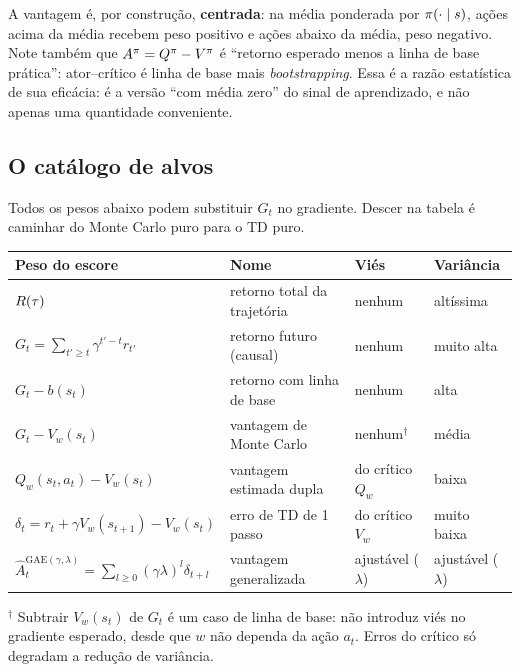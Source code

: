 \documentclass[11pt, a4paper]{article}
\newcommand{\Adv}{A}
\newcommand{\Ahat}{\hat{A}}
\begin{document}
\begin{ideiabox}
A vantagem é, por construção, \textbf{centrada}: na média ponderada por
$\pi(\cdot\mid s)$, ações acima da média recebem peso positivo e ações abaixo
da média, peso negativo. Note também que $\Adv^{\pol} = \Qpi - \Vpi$ é
``retorno esperado menos a linha de base prática'': ator--crítico é linha de base
mais \emph{bootstrapping}. Essa é a
razão estatística de sua eficácia: é a versão ``com média zero'' do sinal de
aprendizado, e não apenas uma quantidade conveniente.
\end{ideiabox}

\subsection{O catálogo de alvos}

Todos os pesos abaixo podem substituir $G_t$ no gradiente. Descer na tabela é
caminhar do Monte Carlo puro para o TD puro.

\medskip
\begin{center}
\small
\begin{tabular}{@{}llll@{}}
\toprule
\textbf{Peso do escore} & \textbf{Nome} & \textbf{Viés} & \textbf{Variância} \\
\midrule
$R(\tau)$ & retorno total da trajetória & nenhum & altíssima \\
$G_t = \sum_{t'\ge t} \gamma^{t'-t} r_{t'}$ & retorno futuro (causal) & nenhum & muito alta \\
$G_t - b(s_t)$ & retorno com linha de base & nenhum & alta \\
$G_t - V_w(s_t)$ & vantagem de Monte Carlo & nenhum$^\dagger$ & média \\
$Q_w(s_t,a_t) - V_w(s_t)$ & vantagem estimada dupla & do crítico $Q_w$ & baixa \\
$\delta_t = r_t + \gamma V_w(s_{t+1}) - V_w(s_t)$ & erro de TD de 1 passo & do crítico $V_w$ & muito baixa \\
$\Ahat_t^{\mathrm{GAE}(\gamma,\lambda)} = \sum_{l\ge0}(\gamma\lambda)^l\delta_{t+l}$ & vantagem generalizada & ajustável ($\lambda$) & ajustável ($\lambda$) \\
\bottomrule
\end{tabular}
\end{center}
\vspace{-0.3em}
{\small $^\dagger$ Subtrair $V_w(s_t)$ de $G_t$ é um caso de linha de base: não
introduz viés no gradiente esperado, desde que $w$ não dependa da ação $a_t$. Erros
do crítico só degradam a redução de variância.}
\end{document}
